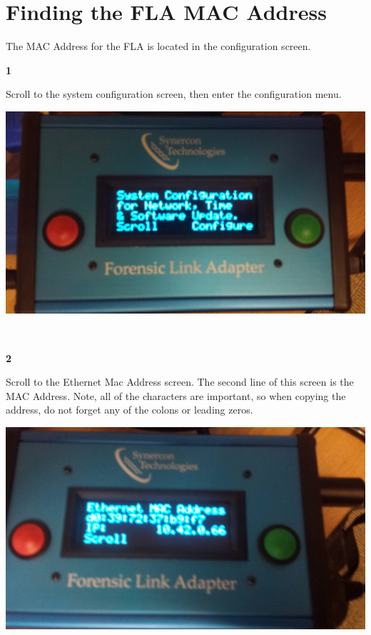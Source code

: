 \documentclass[11pt, oneside]{book}
\begin{document}
\section{Finding the FLA MAC Address}
\label{subsec:finding_mac}
The MAC Address for the FLA is located in the configuration screen.
\\[\baselineskip]
\noindent\begin{minipage}{0.45\textwidth}%
\begin{center}
\textbf{1}\\[\baselineskip]
\end{center}
Scroll to the system configuration screen, then enter the configuration menu.
\end{minipage}%
\hfill%
\begin{minipage}{0.45\textwidth}
\includegraphics[width=\linewidth]{../media/fla_screens/sys_conf}
\end{minipage}
\\[\baselineskip]
\noindent\begin{minipage}{0.45\textwidth}%
\begin{center}
\textbf{2}\\[\baselineskip]
\end{center}
Scroll to the Ethernet Mac Address screen. The second line of this screen is the MAC Address. Note, all of the characters are important, so when copying the address, do not forget any of the colons or leading zeros.
\end{minipage}%
\hfill%
\begin{minipage}{0.45\textwidth}
\includegraphics[width=\linewidth]{../media/fla_screens/sys_conf_mac}
\end{minipage}
\\
\end{document}
